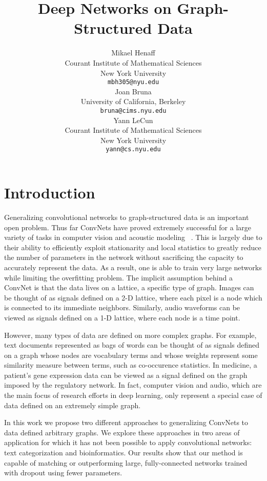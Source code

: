 \documentclass{article} %
\title{Deep Networks on Graph-Structured Data}
\author{
Mikael Henaff \\
Courant Institute of Mathematical Sciences\\
New York University\\
\texttt{mbh305@nyu.edu} \\
\And
Joan Bruna \\
University of California, Berkeley \\
\texttt{bruna@cims.nyu.edu} \\
\AND
Yann LeCun \\
Courant Institute of Mathematical Sciences \\
New York University \\
\texttt{yann@cs.nyu.edu} \\
}
\begin{document}
\maketitle

\begin{abstract}

\end{abstract}

\section{Introduction}

Generalizing convolutional networks to graph-structured data is an important open problem. 
Thus far ConvNets have proved extremely successful for a large variety of tasks in computer vision and acoustic modeling ~\cite{krizhevsky2012,hinton12}. This is largely due to their ability to efficiently exploit stationarity and local statistics to greatly reduce the number of parameters in the network without sacrificing the capacity to accurately represent the data.  
As a result, one is able to train very large networks while limiting the overfitting problem.
The implicit assumption behind a ConvNet is that the data lives on a lattice, a specific type of graph.
Images can be thought of as signals defined on a 2-D lattice, where each pixel is a node which is connected to its immediate neighbors. 
Similarly, audio waveforms can be viewed as signals defined on a 1-D lattice, where each node is a time point. 

However, many types of data are defined on more complex graphs. For example, text documents represented as bags of words can be thought of as signals defined on a graph whose nodes are vocabulary terms and whose weights represent some similarity measure between terms, such as co-occurence statistics. In medicine, a patient's gene expression data can be viewed as a signal defined on the graph imposed by the regulatory network. In fact, computer vision and audio, which are the main focus of research efforts in deep learning, only represent a special case of data defined on an extremely simple graph. 

In this work we propose two different approaches to generalizing ConvNets to data defined arbitrary graphs. We explore these approaches in two areas of application for which it has not been possible to apply convolutional networks: text categorization and bioinformatics. Our results show that our method is capable of matching or outperforming large, fully-connected networks trained with dropout using fewer parameters. 
\end{document}
